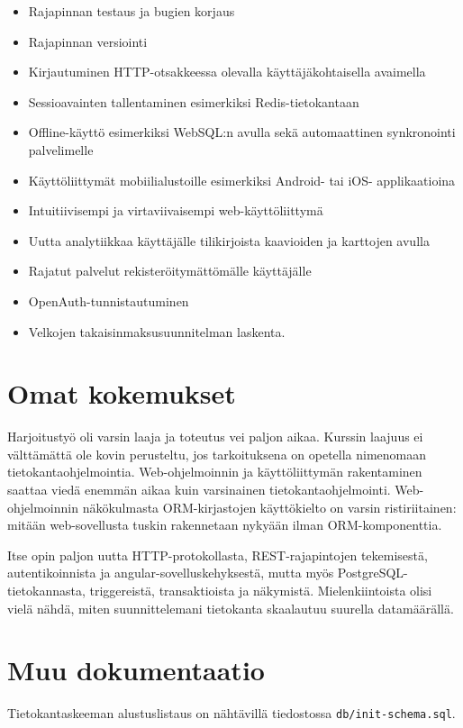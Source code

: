 \documentclass[a4paper,parskip=half]{scrartcl}
\begin{document}
\begin{itemize}
  \item Rajapinnan testaus ja bugien korjaus
  \item Rajapinnan versiointi
  \item Kirjautuminen HTTP-otsakkeessa olevalla käyttäjäkohtaisella avaimella
  \item Sessioavainten tallentaminen esimerkiksi Redis-tietokantaan
  \item Offline-käyttö esimerkiksi WebSQL:n avulla sekä automaattinen
    synkronointi palvelimelle
  \item Käyttöliittymät mobiilialustoille esimerkiksi Android- tai iOS-
    applikaatioina
  \item Intuitiivisempi ja virtaviivaisempi web-käyttöliittymä
  \item Uutta analytiikkaa käyttäjälle tilikirjoista kaavioiden ja karttojen
    avulla
  \item Rajatut palvelut rekisteröitymättömälle käyttäjälle
  \item OpenAuth-tunnistautuminen
  \item Velkojen takaisinmaksusuunnitelman laskenta.
\end{itemize}

\section{Omat kokemukset}

Harjoitustyö oli varsin laaja ja toteutus vei paljon aikaa. Kurssin laajuus
ei välttämättä ole kovin perusteltu, jos tarkoituksena on opetella nimenomaan
tietokantaohjelmointia. Web-ohjelmoinnin ja käyttöliittymän rakentaminen
saattaa viedä enemmän aikaa kuin varsinainen tietokantaohjelmointi.
Web-ohjelmoinnin näkökulmasta ORM-kirjastojen käyttökielto on varsin
ristiriitainen: mitään web-sovellusta tuskin rakennetaan nykyään ilman
ORM-komponenttia.

Itse opin paljon uutta HTTP-protokollasta, REST-rajapintojen tekemisestä,
autentikoinnista ja angular-sovelluskehyksestä, mutta myös PostgreSQL-
tietokannasta, triggereistä, transaktioista ja näkymistä. Mielenkiintoista
olisi vielä nähdä, miten suunnittelemani tietokanta skaalautuu suurella
datamäärällä.

\section{Muu dokumentaatio}

Tietokantaskeeman alustuslistaus on nähtävillä tiedostossa
\texttt{db/init-schema.sql}.
\end{document}
